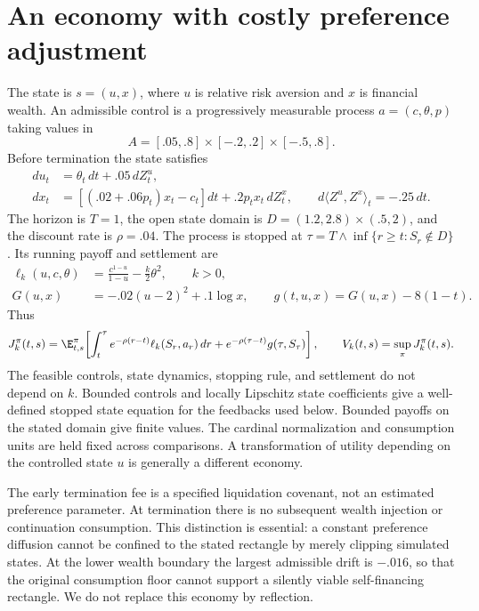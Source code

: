 \section{An economy with costly preference adjustment}\label{r8:economy}
The state is $s=(u,x)$, where $u$ is relative risk aversion and $x$ is financial wealth. An admissible control is a progressively measurable process $a=(c,\theta,p)$ taking values in
\[
 A=[.05,.8]\times[-.2,.2]\times[-.5,.8].
\]
Before termination the state satisfies
\begin{align}
 du_t&=\theta_t\,dt+.05\,dZ^u_t,\\
 dx_t&=[(.02+.06p_t)x_t-c_t]dt+.2p_tx_t\,dZ^x_t,
 \qquad d\langle Z^u,Z^x\rangle_t=-.25\,dt.\label{r8:dynamics}
\end{align}
The horizon is $T=1$, the open state domain is $D=(1.2,2.8)\times(.5,2)$, and the discount rate is $\rho=.04$. The process is stopped at $\tau=T\wedge\inf\{r\geq t:S_r\notin D\}$. Its running payoff and settlement are
\begin{align}
 \ell_k(u,c,\theta)&=\frac{c^{1-u}}{1-u}-\frac{k}{2}\theta^2,\qquad k>0,\\
 G(u,x)&=-.02(u-2)^2+.1\log x,\qquad
 g(t,u,x)=G(u,x)-8(1-t).\label{r8:payoffs}
\end{align}
Thus
\begin{equation}
 J_k^\pi(t,s)=\E_{t,s}^{\pi}\!\left[\int_t^\tau e^{-\rho(r-t)}\ell_k(S_r,a_r)\,dr
       +e^{-\rho(\tau-t)}g(\tau,S_\tau)\right],\qquad
 V_k(t,s)=\sup_{\pi}J_k^\pi(t,s).\label{r8:value}
\end{equation}
The feasible controls, state dynamics, stopping rule, and settlement do not depend on $k$. Bounded controls and locally Lipschitz state coefficients give a well-defined stopped state equation for the feedbacks used below. Bounded payoffs on the stated domain give finite values. The cardinal normalization and consumption units are held fixed across comparisons. A transformation of utility depending on the controlled state $u$ is generally a different economy.

The early termination fee is a specified liquidation covenant, not an estimated preference parameter. At termination there is no subsequent wealth injection or continuation consumption. This distinction is essential: a constant preference diffusion cannot be confined to the stated rectangle by merely clipping simulated states. At the lower wealth boundary the largest admissible drift is $-.016$, so that the original consumption floor cannot support a silently viable self-financing rectangle. We do not replace this economy by reflection.

